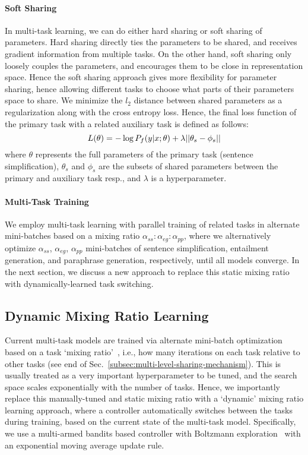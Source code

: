\documentclass[11pt]{article}
\begin{document}
\paragraph{Soft Sharing}
In multi-task learning, we can do either hard sharing or soft sharing of parameters. Hard sharing directly ties the parameters to be shared, and receives gradient information from multiple tasks. On the other hand, soft sharing only loosely couples the parameters, and encourages them to be close in representation space. Hence the soft sharing approach gives more flexibility for parameter sharing, hence allowing different tasks to choose what parts of their parameters space to share. We minimize the $l_2$ distance between shared parameters as a regularization along with the cross entropy loss. Hence, the final loss function of the primary task with a related auxiliary task is defined as follows:
\vspace{-6pt}
\begin{equation}
L(\theta) = - \log P_f (y|x;\theta) + \lambda || \theta_s - \phi_s ||
\vspace{-6pt}
\end{equation}
where $\theta$ represents the full parameters of the primary task (sentence simplification), $\theta_s$ and $\phi_s$ are the subsets of shared parameters between the primary and auxiliary task resp., and $\lambda$ is a hyperparameter.

\paragraph{Multi-Task Training}
We employ multi-task learning with parallel training of related tasks in alternate mini-batches based on a mixing ratio $\alpha_{ss}{:}\alpha_{eg}{:}\alpha_{pp}$, where we alternatively optimize $\alpha_{ss}$, $\alpha_{eg}$, $\alpha_{pp}$ mini-batches of sentence simplification, entailment generation, and paraphrase generation, respectively, until all models converge. In the next section, we discuss a new approach to replace this static mixing ratio with dynamically-learned task switching.

\subsection{Dynamic Mixing Ratio Learning}
\label{subsec:active-sampling}
Current multi-task models are trained via alternate mini-batch optimization based on a task `mixing ratio'~\cite{luong2015multi,pasunuru2017multitask}, i.e., how many iterations on each task relative to other tasks (see end of Sec.~\ref{subsec:multi-level-sharing-mechanism}). This is usually treated as a very important hyperparameter to be tuned, and the search space scales exponentially with the number of tasks. Hence, we importantly replace this manually-tuned and static mixing ratio with a `dynamic' mixing ratio learning approach, where a controller automatically switches between the tasks during training, based on the current state of the multi-task model. Specifically, we use a multi-armed bandits based controller with Boltzmann exploration~\cite{kaelbling1996reinforcement} with an exponential moving average update rule. 
\end{document}

